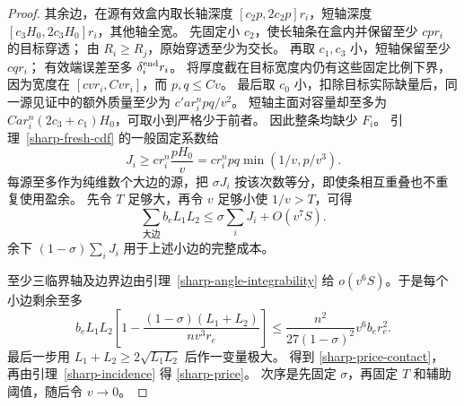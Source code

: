 \begin{proof}
其余边，在源有效盒内取长轴深度
\([c_2p,2c_2p]r_i\)，短轴深度
\([c_3H_0,2c_3H_0]r_i\)，其他轴全宽。
先固定小 \(c_2\)，使长轴条在盒内并保留至少 \(cp r_i\) 的目标穿透；
由 \(R_i\ge R_j\)，原始穿透至少为交长。
再取 \(c_1,c_3\) 小，短轴保留至少 \(cq r_i\)；
有效端误差至多 \(\delta_i^{\rm end}r_i\)。
将厚度截在目标宽度内仍有这些固定比例下界，因为宽度在
\([cvr_i,Cvr_i]\)，而 \(p,q\le Cv\)。
最后取 \(c_0\) 小，扣除目标实际缺量后，同一源见证中的额外质量至少为
\(c'a r_i^npq/v^2\)。
短轴主面对容量却至多为
\(Ca r_i^n(2c_3+c_1)H_0\)，可取小到严格少于前者。
因此整条均缺少 \(F_i\)。
引理~\ref{sharp-fresh-cdf} 的一般固定系数给
\[
 J_i\ge c r_i^n\frac{pH_0}{v}
 =c r_i^npq\min(1/v,p/v^3).
\]
每源至多作为纯维数个大边的源，把 \(\sigma J_i\)
按该次数等分，即使条相互重叠也不重复使用盈余。
先令 \(T\) 足够大，再令 \(v\) 足够小使 \(1/v>T\)，可得
\[
 \sum_{\text{大边}}b_eL_1L_2
 \le\sigma\sum_iJ_i+O(v^7S).
\]
余下 \((1-\sigma)\sum_iJ_i\) 用于上述小边的完整成本。

至少三临界轴及边界边由引理~\ref{sharp-angle-integrability}
给 \(o(v^6S)\)。于是每个小边剩余至多
\[
 b_eL_1L_2\left[1-\frac{(1-\sigma)(L_1+L_2)}{nv^3r_e}\right]
 \le\frac{n^2}{27(1-\sigma)^2}v^6b_er_e^2.
\]
最后一步用 \(L_1+L_2\ge2\sqrt{L_1L_2}\) 后作一变量极大。
得到 \eqref{sharp-price-contact}，
再由引理~\ref{sharp-incidence} 得 \eqref{sharp-price}。
次序是先固定 \(\sigma\)，再固定 \(T\) 和辅助阈值，随后令 \(v\to0\)。
\end{proof}
